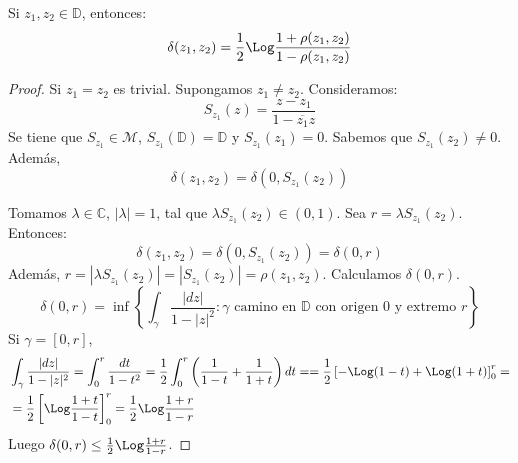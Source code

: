 \begin{proposition}
    Si $z_1, z_2 \in \mathbb{D}$, entonces:
    $$\delta(z_1, z_2) = \frac{1}{2} \Log \frac{1+\rho(z_1, z_2)}{1-\rho(z_1, z_2)}$$
\end{proposition}

\begin{proof}
    Si $z_1 = z_2$ es trivial.
    Supongamos $z_1 \neq z_2$.
    Consideramos:
    $$S_{z_1}(z) = \frac{z-z_1}{1-\overline{z_1}z}$$
    Se tiene que $S_{z_1} \in \mathcal{M}$, $S_{z_1}(\mathbb{D}) = \mathbb{D}$ y $S_{z_1}(z_1) = 0$.
    Sabemos que $S_{z_1}(z_2) \neq 0$.
    Además,
    $$\delta(z_1, z_2) = \delta(0, S_{z_1}(z_2))$$

    Tomamos $\lambda \in \mathbb{C}$, $|\lambda| = 1$, tal que $\lambda S_{z_1}(z_2) \in (0, 1)$.
    Sea $r = \lambda S_{z_1}(z_2)$.
    Entonces:
    $$\delta(z_1, z_2) = \delta(0, S_{z_1}(z_2)) = \delta(0, r)$$
    Además, $r = |\lambda S_{z_1}(z_2)| = |S_{z_1}(z_2)| = \rho(z_1, z_2)$.
    Calculamos $\delta(0, r)$.
    $$\delta(0, r) = \inf \left\{\int_\gamma \frac{|dz|}{1-|z|^2} : \gamma \text{ camino en } \mathbb{D} \text{ con origen } 0 \text{ y extremo } r\right\}$$
    Si $\gamma = [0, r]$,
    \begin{align*}
         & \int_\gamma \frac{|dz|}{1-|z|^2} = \int_0^r \frac{dt}{1-t^2} = \frac{1}{2} \int_0^r \left(\frac{1}{1-t} + \frac{1}{1+t}\right)dt = = \frac{1}{2} \left[-\Log(1-t) + \Log(1+t)\right]_0^r = \\
         & = \frac{1}{2} \left[\Log \frac{1+t}{1-t}\right]_0^r = \frac{1}{2} \Log\frac{1+r}{1-r}
    \end{align*}
    Luego $\delta(0, r) \leq \frac{1}{2} \Log\frac{1+r}{1-r}$.


\end{proof}
